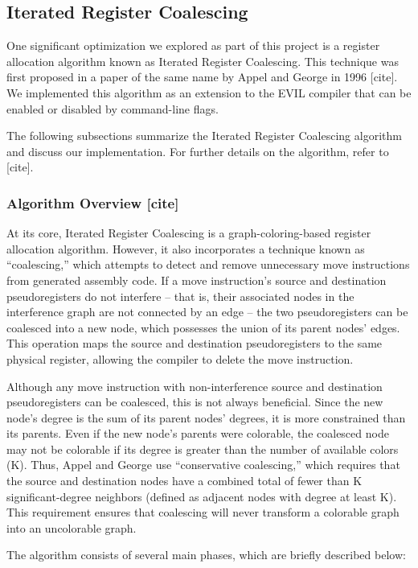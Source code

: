 \documentclass[12pt]{article}
\begin{document}
\begin{multicols}{2}
\subsection{Iterated Register Coalescing}
One significant optimization we explored as part of this project is a register allocation algorithm known as Iterated Register Coalescing.
This technique was first proposed in a paper of the same name by Appel and George in 1996 [cite].
We implemented this algorithm as an extension to the EVIL compiler that can be enabled or disabled by command-line flags.

The following subsections summarize the Iterated Register Coalescing algorithm and discuss our implementation.
For further details on the algorithm, refer to [cite].

\subsubsection{Algorithm Overview [cite]}

At its core, Iterated Register Coalescing is a graph-coloring-based register allocation algorithm.
However, it also incorporates a technique known as “coalescing,” which attempts to detect and remove unnecessary move instructions from generated assembly code.
If a move instruction’s source and destination pseudoregisters do not interfere – that is, their associated nodes in the interference graph are not connected by an edge – the two pseudoregisters can be coalesced into a new node, which possesses the union of its parent nodes’ edges.
This operation maps the source and destination pseudoregisters to the same physical register, allowing the compiler to delete the move instruction.

Although any move instruction with non-interference source and destination pseudoregisters can be coalesced, this is not always beneficial.
Since the new node’s degree is the sum of its parent nodes’ degrees, it is more constrained than its parents.
Even if the new node’s parents were colorable, the coalesced node may not be colorable if its degree is greater than the number of available colors (K).
Thus, Appel and George use “conservative coalescing,” which requires that the source and destination nodes have a combined total of fewer than K significant-degree neighbors (defined as adjacent nodes with degree at least K).
This requirement ensures that coalescing will never transform a colorable graph into an uncolorable graph.

The algorithm consists of several main phases, which are briefly described below:


\end{multicols}
\end{document}
